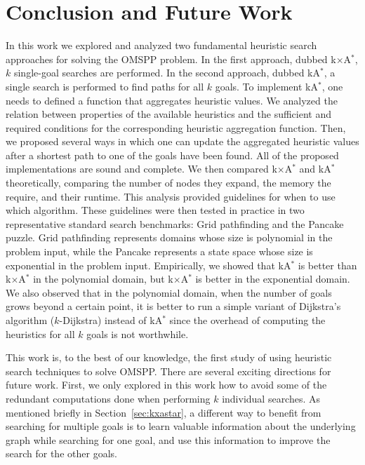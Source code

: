 \documentclass[smallextended]{svjour3}       %
\newcommand{\kD}{$k$-Dijkstra\xspace}
\newcommand{\omspp}{\ac{OMSPP}\xspace}
\newcommand{\kastar}{kA$^*$\xspace}
\newcommand{\kxastar}{k$\times$A$^*$\xspace}
\begin{document}

\section{Conclusion and Future Work}
\label{sec:conclusion}
In this work we explored and analyzed two fundamental heuristic search approaches for solving the \omspp problem. 
In the first approach, dubbed \kxastar, $k$ single-goal searches are performed. In the second approach, dubbed \kastar, a single search is performed to find paths for all $k$ goals. 
To implement \kastar, one needs to defined a function that aggregates heuristic values. We analyzed the relation between properties of the available heuristics and the sufficient and required conditions for the corresponding heuristic aggregation function. Then, we proposed several ways in which one can update the aggregated heuristic values after a shortest path to one of the goals have been found. All of the proposed implementations are sound and complete. 
We then compared \kxastar and \kastar theoretically, comparing the number of nodes they expand, the memory the require, and their runtime.
This analysis provided guidelines for when to use which algorithm.
These guidelines were then tested in practice in two representative standard search benchmarks: Grid pathfinding and the Pancake puzzle. Grid pathfinding represents domains whose size is polynomial in the problem input, while the Pancake represents a state space whose size is exponential in the problem input. Empirically, we showed that \kastar is better than \kxastar in the polynomial domain, but \kxastar is better in the exponential domain. 
We also observed that in the polynomial domain, when the number of goals grows beyond a certain point, it is better to run a simple variant of Dijkstra's algorithm (\kD) instead of \kastar since the overhead of computing the heuristics for all $k$ goals is not worthwhile. 


This work is, to the best of our knowledge, the first study of using heuristic search techniques to solve \omspp.
There are several exciting directions for future work.
First, we only explored in this work how to avoid some of the redundant computations done when performing $k$ individual searches.
As mentioned briefly in Section~\ref{sec:kxastar}, a different way to benefit from searching for multiple goals is to learn valuable information about the underlying graph while searching for one goal, and use this information to improve the search for the other goals. %
\end{document}
